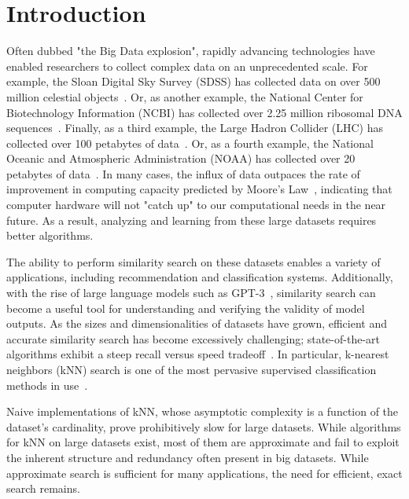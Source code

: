 \section{Introduction}
\label{sec:introduction}

Often dubbed "the Big Data explosion", rapidly advancing technologies have enabled researchers to collect complex data on an unprecedented scale. 
For example, the Sloan Digital Sky Survey (SDSS) has collected data on over 500 million celestial objects~\cite{alam2015eleventh}. Or, as another 
example, the National Center for Biotechnology Information (NCBI) has collected over 2.25 million ribosomal DNA sequences~\cite{silva2014silva}. Finally, 
as a third example, the Large Hadron Collider (LHC) has collected over 100 petabytes of data~\cite{evans2008lhc}. Or, as a fourth example, the 
National Oceanic and Atmospheric Administration (NOAA) has collected over 20 petabytes of data~\cite{noaa2019noaa}. 
In many cases, the influx of data outpaces the rate of improvement in computing capacity predicted by Moore's Law~\cite{moore1965cramming}, indicating 
that computer hardware will not "catch up" to our computational needs in the near future. As a result, analyzing and learning from these large datasets 
requires better algorithms. 

The ability to perform similarity search on these datasets enables a variety of applications, including recommendation and classification systems. 
Additionally, with the rise of large language models such as GPT-3~\cite{brown2020language}, similarity search can become a useful tool for 
understanding and verifying the validity of model outputs. 
As the sizes and dimensionalities of datasets have grown, efficient and accurate similarity search has become excessively challenging; 
state-of-the-art algorithms exhibit a steep recall versus speed tradeoff~\cite{ishaq2019clustered}.
In particular, k-nearest neighbors (kNN) search is one of the most pervasive supervised classification methods in use~\cite{fix1952discriminatory, cover1967nearest}.

Naive implementations of kNN, whose asymptotic complexity is a function of the dataset's cardinality, 
prove prohibitively slow for large datasets. While algorithms for kNN on large datasets exist, most of them are approximate and fail to 
exploit the inherent structure and redundancy often present in big datasets. While approximate search is sufficient for many applications, the 
need for efficient, exact search remains.

